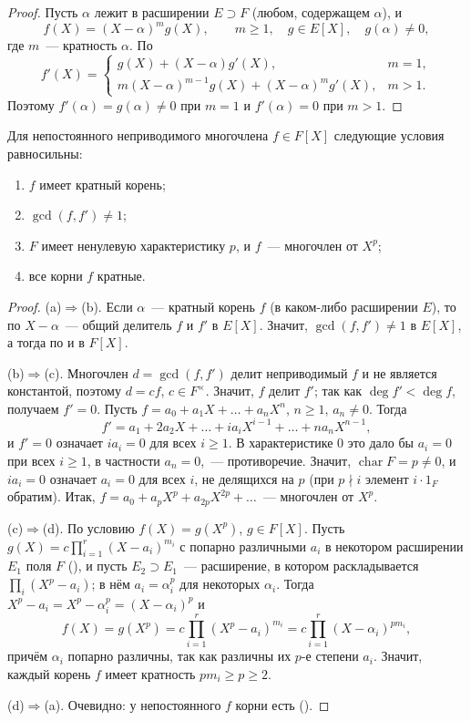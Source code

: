 \begin{proof}
Пусть $\alpha$ лежит в расширении $E\supset F$ (любом, содержащем $\alpha$), и
\[
f(X)=(X-\alpha)^mg(X),\qquad m\ge1,\quad g\in E[X],\quad g(\alpha)\ne0,
\]
где $m$~--- кратность $\alpha$. По 
\begin{equation}\label{eq:ch2B-deriv}
f'(X)=\begin{cases}g(X)+(X-\alpha)g'(X),& m=1,\\[2pt]
m(X-\alpha)^{m-1}g(X)+(X-\alpha)^mg'(X),& m>1.\end{cases}
\end{equation}
Поэтому $f'(\alpha)=g(\alpha)\ne0$ при $m=1$ и $f'(\alpha)=0$ при $m>1$.
\end{proof}

\begin{proposition}[2.20]
Для непостоянного неприводимого многочлена $f\in F[X]$ следующие условия равносильны:
\begin{enumerate}[label=(\alph*)]
\item $f$ имеет кратный корень;
\item $\gcd(f,f')\ne1$;
\item $F$ имеет ненулевую характеристику $p$, и $f$~--- многочлен от $X^p$;
\item все корни $f$ кратные.
\end{enumerate}
\end{proposition}

\begin{proof}
(a)$\Rightarrow$(b). Если $\alpha$~--- кратный корень $f$ (в каком-либо расширении $E$), то по  $X-\alpha$~---
общий делитель $f$ и $f'$ в $E[X]$. Значит, $\gcd(f,f')\ne1$ в $E[X]$, а тогда по  и в $F[X]$.

(b)$\Rightarrow$(c). Многочлен $d=\gcd(f,f')$ делит неприводимый $f$ и не является константой, поэтому $d=cf$,
$c\in F^\times$. Значит, $f$ делит $f'$; так как $\deg f'<\deg f$, получаем $f'=0$. Пусть $f=a_0+a_1X+\dots+a_nX^n$,
$n\ge1$, $a_n\ne0$. Тогда
\[
f'=a_1+2a_2X+\dots+ia_iX^{i-1}+\dots+na_nX^{n-1},
\]
и $f'=0$ означает $ia_i=0$ для всех $i\ge1$. В характеристике $0$ это дало бы $a_i=0$ при всех $i\ge1$, в частности
$a_n=0$,~--- противоречие. Значит, $\operatorname{char}F=p\ne0$, и $ia_i=0$ означает $a_i=0$ для всех $i$, не делящихся на
$p$ (при $p\nmid i$ элемент $i\cdot1_F$ обратим). Итак, $f=a_0+a_pX^p+a_{2p}X^{2p}+\dots$~--- многочлен от $X^p$.

(c)$\Rightarrow$(d). По условию $f(X)=g(X^p)$, $g\in F[X]$. Пусть $g(X)=c\prod_{i=1}^r(X-a_i)^{m_i}$ с попарно
различными $a_i$ в некотором расширении $E_1$ поля $F$ (), и пусть $E_2\supset E_1$~--- расширение, в котором
раскладывается $\prod_i(X^p-a_i)$; в нём $a_i=\alpha_i^p$ для некоторых $\alpha_i$. Тогда
$X^p-a_i=X^p-\alpha_i^p=(X-\alpha_i)^p$ и
\[
f(X)=g(X^p)=c\prod_{i=1}^r(X^p-a_i)^{m_i}=c\prod_{i=1}^r(X-\alpha_i)^{pm_i},
\]
причём $\alpha_i$ попарно различны, так как различны их $p$-е степени $a_i$. Значит, каждый корень $f$ имеет кратность
$pm_i\ge p\ge2$.

(d)$\Rightarrow$(a). Очевидно: у непостоянного $f$ корни есть ().
\end{proof}

